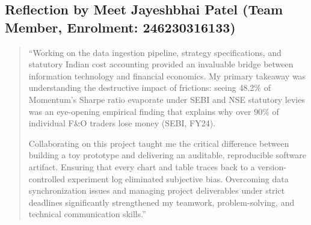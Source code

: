 \documentclass[12pt,a4paper,oneside]{report}
\begin{document}
\subsection{Reflection by Meet Jayeshbhai Patel (Team Member, Enrolment: 246230316133)}
\begin{quote}
``Working on the data ingestion pipeline, strategy specifications, and statutory
Indian cost accounting provided an invaluable bridge between information technology and
financial economics. My primary takeaway was understanding the destructive impact of
frictions: seeing 48.2\% of Momentum's Sharpe ratio evaporate under SEBI and NSE
statutory levies was an eye-opening empirical finding that explains why over 90\% of
individual F\&O traders lose money (SEBI, FY24).

Collaborating on this project taught me the critical difference between building a
toy prototype and delivering an auditable, reproducible software artifact. Ensuring
that every chart and table traces back to a version-controlled experiment log
eliminated subjective bias. Overcoming data synchronization issues and managing
project deliverables under strict deadlines significantly strengthened my teamwork,
problem-solving, and technical communication skills.''
\end{quote}
\end{document}
